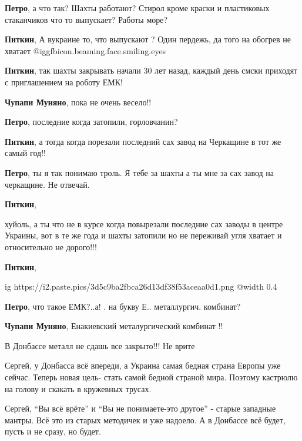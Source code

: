 \begin{itemize}
\begin{itemize}
\textbf{Петро}, а что так? Шахты работают? Стирол кроме краски и пластиковых стаканчиков что то выпускает? Работы море?

\textbf{Питкин}, А вукраине то, что выпускают ? Один пердежь, да того на обогрев не хватает @igg{fbicon.beaming.face.smiling.eyes} 

\textbf{Питкин}, так шахты закрывать начали 30 лет назад, каждый день смски приходят с приглашением на роботу ЕМК!

\textbf{Чупапи Муняно}, пока не очень весело!!

\textbf{Петро}, последние когда затопили, горловчанин?

\textbf{Питкин}, а тогда когда порезали последний сах завод на Черкащине в тот же самый год!!

\textbf{Петро}, ты я так понимаю троль. Я тебе за шахты а ты мне за сах завод на черкащине. Не отвечай.

\textbf{Питкин}, 

хуйоль, а ты что не в курсе когда повырезали последние сах заводы в центре
Украины, вот в те же года и шахты затопили но не переживай угля хватает и
относительно не дорого!!!

\textbf{Питкин},

\ifcmt
  ig https://i2.paste.pics/3d5c9ba2fbca26d13df38f53aceaa0d1.png
  @width 0.4
\fi

\textbf{Петро}, что такое ЕМК?..а! . на букву Е.. металлургич. комбинат?

\textbf{Чупапи Муняно}, Енакиевский металургический комбинат !!

\end{itemize} %


В Донбассе металл не сдашь все закрыто!!! Не врите

\begin{itemize} %

Сергей, у Донбасса всё впереди, а Украина самая бедная страна Европы уже
сейчас. Теперь новая цель- стать самой бедной страной мира. Поэтому кастрюлю на
голову и скакать в кружевных трусах.


Сергей, \enquote{Вы всё врёте} и \enquote{Вы не понимаете-это другое} - старые западные
мантры. Всё это из старых методичек и уже надоело. А в Донбассе всё будет, пусть и
не сразу, но будет.


\end{itemize}
\end{itemize}
